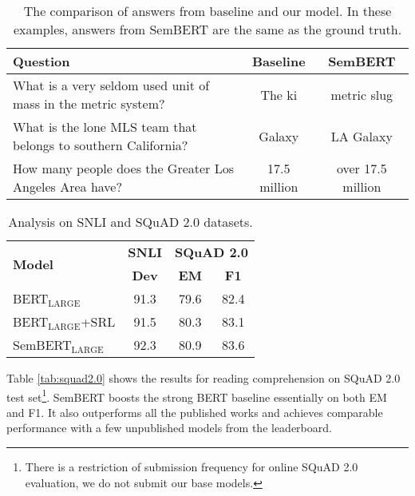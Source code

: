 \documentclass[letterpaper]{article} \usepackage{aaai20}  \usepackage{times}  \usepackage{helvet} \usepackage{courier}  \usepackage[hyphens]{url}  \usepackage{graphicx} \urlstyle{rm} \def\UrlFont{\rm}  \usepackage{graphicx}  \frenchspacing  \usepackage{amssymb}
\begin{document}
 
\begin{table*}
	\centering
	{
		\begin{tabular}{l c c}
			\hline
			
			\hline
			Question & Baseline  & SemBERT\\
			\hline
			What is a very seldom used unit of mass in the metric system? & The ki &metric slug\\
What is the lone MLS team that belongs to southern California? &Galaxy  &LA Galaxy\\
			How many people does the Greater Los Angeles Area have?  & 17.5 million&over 17.5 million\\
			
			\hline
			
			\hline
		\end{tabular}
	}
	
	\caption{\label{tab:ans} The comparison of answers from baseline and our model. In these examples, answers from SemBERT are the same as the ground truth.}
\end{table*}

	\begin{table}
		\centering

		{
			\begin{tabular}{l c c c}
				\hline
				
				\hline
				\multirow{2}{*}{\textbf{Model}} &\textbf{SNLI} &\multicolumn{2}{c}{\textbf{SQuAD 2.0}} \\
				& \textbf{Dev}   &  \textbf{EM} & \textbf{F1}\\
				\hline
				BERT$_\text{LARGE}$ & 91.3 & 79.6 & 82.4 \\
				BERT$_\text{LARGE}$+SRL & 91.5 & 80.3 & 83.1 \\ 
				SemBERT$_\text{LARGE}$ &  92.3  & 80.9 & 83.6 \\    
				\hline
			\end{tabular}
		}

		\caption{\label{tab:ablation} Analysis on SNLI and SQuAD 2.0 datasets.}
	\end{table}
Table \ref{tab:squad2.0} shows the results for reading comprehension on SQuAD 2.0 test set\footnote[9]{There is a restriction of submission frequency for online SQuAD 2.0 evaluation, we do not submit our base models.}. SemBERT boosts the strong BERT baseline essentially on both EM and F1. It also outperforms all the published works and achieves comparable performance with a few unpublished models from the leaderboard. 
\end{document}
